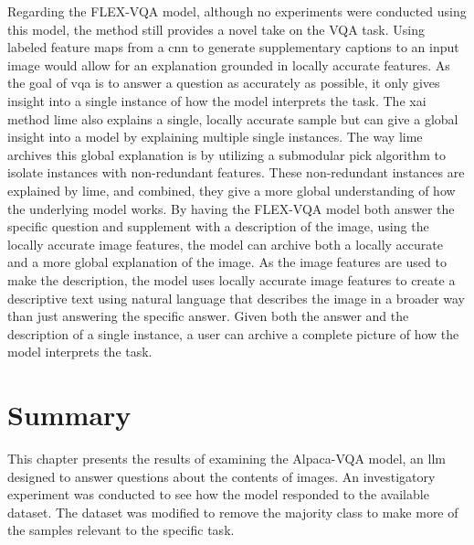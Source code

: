 Regarding the FLEX-VQA model, although no experiments were conducted using this model, the method still provides a novel take on the VQA task. Using labeled feature maps from a \gls{cnn} to generate supplementary captions to an input image would allow for an explanation grounded in locally accurate features.
As the goal of \gls{vqa} is to answer a question as accurately as possible, it only gives insight into a single instance of how the model interprets the task. The \gls{xai} method \gls{lime} also explains a single, locally accurate sample but can give a global insight into a model by explaining multiple single instances. The way \gls{lime} archives this global explanation is by utilizing a submodular pick algorithm to isolate instances with non-redundant features. These non-redundant instances are explained by \gls{lime}, and combined, they give a more global understanding of how the underlying model works.
By having the FLEX-VQA model both answer the specific question and supplement with a description of the image, using the locally accurate image features, the model can archive  both a locally accurate and a more global explanation of the image. As the image features are used to make the description, the model uses locally accurate image features to create a descriptive text using natural language that describes the image in a broader way than just answering the specific answer. Given both the answer and the description of a single instance, a user can archive a complete picture of how the model interprets the task.


\section{Summary}
\label{sec4:summary}

This chapter presents the results of examining the Alpaca-VQA model, an \gls{llm} designed to answer questions about the contents of images. An investigatory experiment was conducted to see how the model responded to the available dataset. The dataset was modified to remove the majority class to make more of the samples relevant to the specific task.

